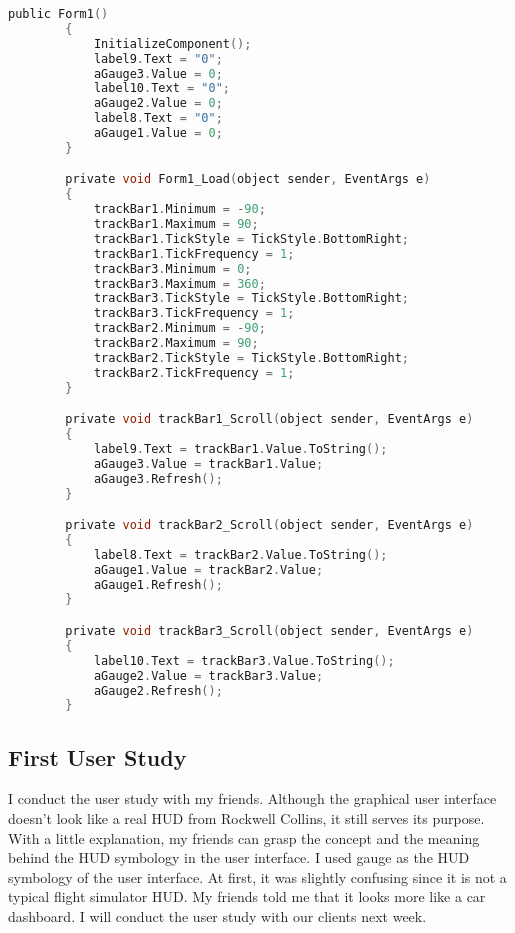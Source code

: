\begin{lstlisting}[language=c]
		public Form1()
        {
            InitializeComponent();
            label9.Text = "0";
            aGauge3.Value = 0;
            label10.Text = "0";
            aGauge2.Value = 0;
            label8.Text = "0";
            aGauge1.Value = 0;
        }

        private void Form1_Load(object sender, EventArgs e)
        {
            trackBar1.Minimum = -90;
            trackBar1.Maximum = 90;
            trackBar1.TickStyle = TickStyle.BottomRight;
            trackBar1.TickFrequency = 1;
            trackBar3.Minimum = 0;
            trackBar3.Maximum = 360;
            trackBar3.TickStyle = TickStyle.BottomRight;
            trackBar3.TickFrequency = 1;
            trackBar2.Minimum = -90;
            trackBar2.Maximum = 90;
            trackBar2.TickStyle = TickStyle.BottomRight;
            trackBar2.TickFrequency = 1;
        }

        private void trackBar1_Scroll(object sender, EventArgs e)
        {
            label9.Text = trackBar1.Value.ToString();
            aGauge3.Value = trackBar1.Value;
            aGauge3.Refresh();
        }

        private void trackBar2_Scroll(object sender, EventArgs e)
        {
            label8.Text = trackBar2.Value.ToString();
            aGauge1.Value = trackBar2.Value;
            aGauge1.Refresh();
        }

        private void trackBar3_Scroll(object sender, EventArgs e)
        {
            label10.Text = trackBar3.Value.ToString();
            aGauge2.Value = trackBar3.Value;
            aGauge2.Refresh();
        }
\end{lstlisting}

\subsection{First User Study}
I conduct the user study with my friends. Although the graphical user interface doesn’t look like a real HUD from Rockwell Collins, it still serves its purpose. With a little explanation, my friends can grasp the concept and the meaning behind the HUD symbology in the user interface. I used gauge as the HUD symbology of the user interface. At first, it was slightly confusing since it is not a typical flight simulator HUD. My friends told me that it looks more like a car dashboard. I will conduct the user study with our clients next week.  



